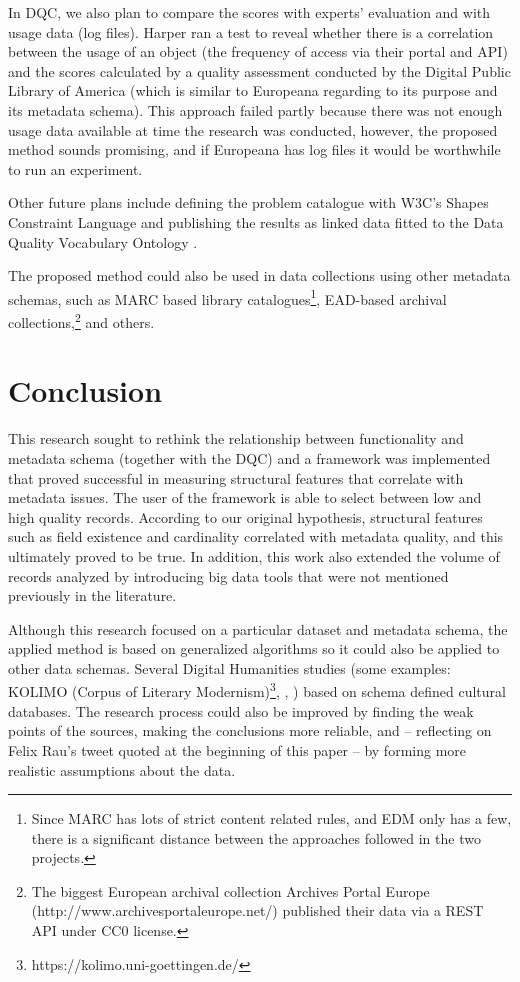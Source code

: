 In DQC, we also plan to compare the scores with experts’ evaluation and with usage data (log files). Harper ran a test to reveal whether there is a correlation between the usage of an object (the frequency of access via their portal and API) and the scores calculated by a quality assessment conducted by the Digital Public Library of America (which is similar to Europeana regarding to its purpose and its metadata schema). This approach failed partly because there was not enough usage data available at time the research was conducted, however, the proposed method sounds promising, and if Europeana has log files it would be worthwhile to run an experiment.

Other future plans include defining the problem catalogue with W3C’s Shapes Constraint Language \cite{knublauch2017} and publishing the results as linked data fitted to the Data Quality Vocabulary Ontology \cite{albertoni-isaac2016}.

The proposed method could also be used in data collections using other metadata schemas, such as MARC based library catalogues\footnote{Since MARC has lots of strict content related rules, and EDM only has a few, there is a significant distance between the approaches followed in the two projects.}, EAD-based archival collections,\footnote{The biggest European archival collection Archives Portal Europe (http://www.archivesportaleurope.net/) published their data via a REST API under CC0 license.} and others.

\section{Conclusion}

This research sought to rethink the relationship between functionality and metadata schema (together with the DQC) and a framework was implemented that proved successful in measuring structural features that correlate with metadata issues. The user of the framework is able to select between low and high quality records. According to our original hypothesis, structural features such as field existence and cardinality correlated with metadata quality, and this ultimately proved to be true. In addition, this work also extended the volume of records analyzed by introducing big data tools that were not mentioned previously in the literature.

Although this research focused on a particular dataset and metadata schema, the applied method is based on generalized algorithms so it could also be applied to other data schemas. Several Digital Humanities studies (some examples: KOLIMO (Corpus of Literary Modernism)\footnote{https://kolimo.uni-goettingen.de/}, \cite{strezoski2017}, \cite{schmidt2017}) based on schema defined cultural databases. The research process could also be improved by finding the weak points of the sources, making the conclusions more reliable, and -- reflecting on Felix Rau's tweet quoted at the beginning of this paper -- by forming more realistic assumptions about the data.

